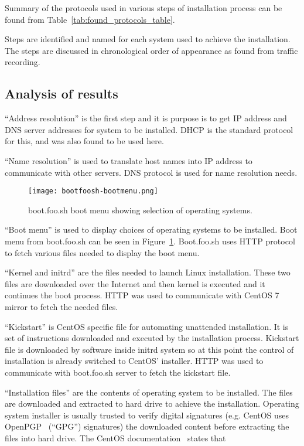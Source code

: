 Summary of the protocols used in various steps of installation process
can be found from Table~\ref{tab:found_protocols_table}.

Steps are identified and named for each system used to achieve the
installation. The steps are discussed in chronological order of
appearance as found from traffic recording.

\subsection{Analysis of results}

``Address resolution'' is the first step and it is purpose is to get IP
address and DNS server addresses for system to be installed. DHCP is
the standard protocol for this, and was also found to be used here.

``Name resolution'' is used to translate host names into IP address to
communicate with other servers. DNS protocol is used for name
resolution needs.

\begin{figure}[h]
  \caption{boot.foo.sh boot menu showing selection of operating
    systems.\label{fig:bootmenu}}
  \texttt{[image: bootfoosh-bootmenu.png]}
\end{figure}

``Boot menu'' is used to display choices of operating systems to be
installed. Boot menu from boot.foo.sh can be seen in
Figure~\ref{fig:bootmenu}. Boot.foo.sh uses HTTP protocol to fetch
various files needed to display the boot menu.

``Kernel and initrd'' are the files needed to launch Linux
installation. These two files are downloaded over the Internet and
then kernel is executed and it continues the boot process. HTTP was
used to communicate with CentOS 7 mirror to fetch the needed files.

``Kickstart'' is CentOS specific file for automating unattended
installation. It is set of instructions downloaded and executed by the
installation process. Kickstart file is downloaded by software inside
initrd system so at this point the control of installation is already
switched to CentOS' installer. HTTP was used to communicate with
boot.foo.sh server to fetch the kickstart file.

``Installation files'' are the contents of operating system to be
installed. The files are downloaded and extracted to hard drive to
achieve the installation. Operating system installer is usually
trusted to verify digital signatures (e.g. CentOS uses
OpenPGP~\cite{RFC4880} (``GPG'') signatures) the downloaded content
before extracting the files into hard drive. The CentOS
documentation~\cite{centos-gpg} states that

